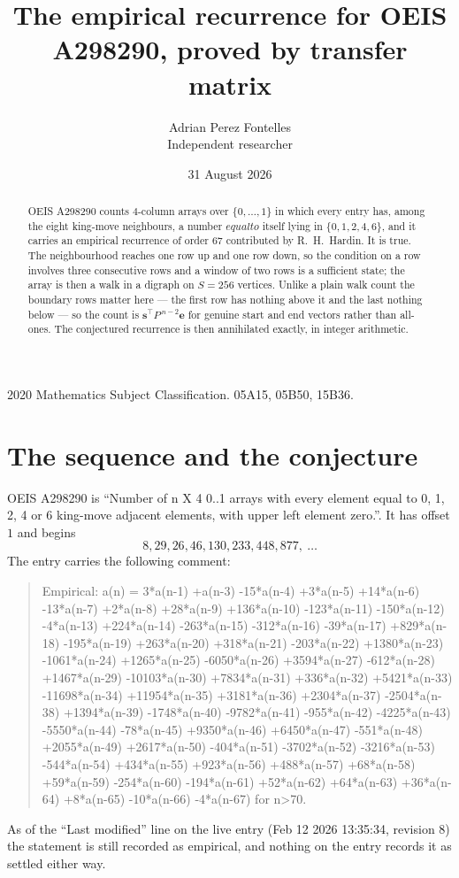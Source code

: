 \documentclass[11pt,a4paper]{article}
\title{The empirical recurrence for OEIS A298290, proved by transfer matrix}
\author{Adrian Perez Fontelles\\ \small Independent researcher}
\date{31 August 2026}
\theoremstyle{plain}
\theoremstyle{definition}
\begin{document}
\maketitle

\begin{abstract}
OEIS A298290 counts $4$-column arrays over $\{0,\dots,1\}$ in which every entry has,
among the eight king-move neighbours, a number $equal to$ itself lying in $\{0,1,2,4,6\}$, and it carries an empirical
recurrence of order $67$ contributed by R.~H.~Hardin. It is true. The neighbourhood
reaches one row up and one row down, so the condition on a row involves three consecutive
rows and a window of two rows is a sufficient state; the array is then a walk in a digraph
on $S=256$ vertices. Unlike a plain walk count the boundary rows matter here --- the first
row has nothing above it and the last nothing below --- so the count is
$\mathbf{s}^{\!\top}P^{\,n-2}\mathbf{e}$ for genuine start and end vectors rather than
all-ones. The conjectured recurrence is then annihilated exactly, in integer arithmetic.
\end{abstract}

\noindent\small 2020 Mathematics Subject Classification. 05A15, 05B50, 15B36.\normalsize

\section{The sequence and the conjecture}

OEIS A298290 is ``Number of n X 4 0..1 arrays with every element equal to 0, 1, 2, 4 or 6 king-move adjacent elements, with upper left element zero.''. It has offset
$1$ and begins
\[
8, 29, 26, 46, 130, 233, 448, 877,\ \dots
\]
The entry carries the following comment:
\begin{quote}\small
Empirical: a(n) = 3*a(n-1) +a(n-3) -15*a(n-4) +3*a(n-5) +14*a(n-6) -13*a(n-7) +2*a(n-8) +28*a(n-9) +136*a(n-10) -123*a(n-11) -150*a(n-12) -4*a(n-13) +224*a(n-14) -263*a(n-15) -312*a(n-16) -39*a(n-17) +829*a(n-18) -195*a(n-19) +263*a(n-20) +318*a(n-21) -203*a(n-22) +1380*a(n-23) -1061*a(n-24) +1265*a(n-25) -6050*a(n-26) +3594*a(n-27) -612*a(n-28) +1467*a(n-29) -10103*a(n-30) +7834*a(n-31) +336*a(n-32) +5421*a(n-33) -11698*a(n-34) +11954*a(n-35) +3181*a(n-36) +2304*a(n-37) -2504*a(n-38) +1394*a(n-39) -1748*a(n-40) -9782*a(n-41) -955*a(n-42) -4225*a(n-43) -5550*a(n-44) -78*a(n-45) +9350*a(n-46) +6450*a(n-47) -551*a(n-48) +2055*a(n-49) +2617*a(n-50) -404*a(n-51) -3702*a(n-52) -3216*a(n-53) -544*a(n-54) +434*a(n-55) +923*a(n-56) +488*a(n-57) +68*a(n-58) +59*a(n-59) -254*a(n-60) -194*a(n-61) +52*a(n-62) +64*a(n-63) +36*a(n-64) +8*a(n-65) -10*a(n-66) -4*a(n-67) for n>70.
\end{quote}
As of the ``Last modified'' line on the live entry (Feb 12 2026 13:35:34, revision
8) the statement is still recorded as empirical, and nothing on the entry
records it as settled either way.
\end{document}
